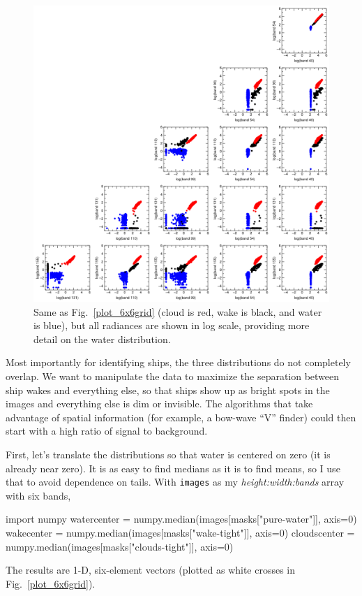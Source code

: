 \documentclass[12pt]{article}
\begin{document}
\begin{figure}[p]
\begin{center}
\includegraphics[width=\linewidth]{plot_log6x6grid.png}
\end{center}
\caption{Same as Fig.~\ref{plot_6x6grid} (cloud is red, wake is black,
  and water is blue), but all radiances are shown in log scale,
  providing more detail on the water
  distribution. \label{plot_log6x6grid}}
\end{figure}

Most importantly for identifying ships, the three distributions do not
completely overlap.  We want to manipulate the data to maximize the
separation between ship wakes and everything else, so that ships show
up as bright spots in the images and everything else is dim or
invisible.  The algorithms that take advantage of spatial information
(for example, a bow-wave ``V'' finder) could then start with a high ratio
of signal to background.

First, let's translate the distributions so that water is centered on
zero (it is already near zero).  It is as easy to find medians as it
is to find means, so I use that to avoid dependence on tails.  With
{\tt images} as my {\it height:width:bands} array with six bands,
\begin{python}
import numpy
watercenter = numpy.median(images[masks["pure-water"]], axis=0)
wakecenter = numpy.median(images[masks["wake-tight"]], axis=0)
cloudscenter = numpy.median(images[masks["clouds-tight"]], axis=0)
\end{python}
The results are 1-D, six-element vectors (plotted as white crosses in Fig.~\ref{plot_6x6grid}).
\end{document}
